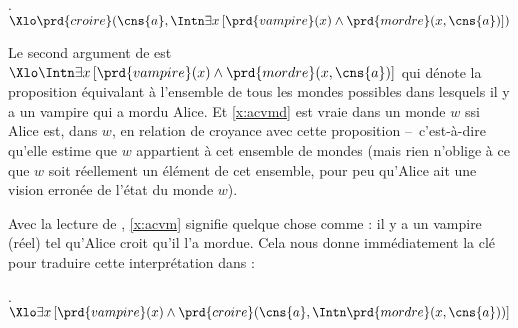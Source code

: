 \ex. 
\(\Xlo\prd{croire}(\cns{a}, \Intn\exists x\,[\prd{vampire}(x) \wedge \prd{mordre}(x,\cns{a})] )\)
\label{x:acvmd}


Le second argument de  est \(\Xlo\Intn\exists x\,[\prd{vampire}(x) \wedge \prd{mordre}(x,\cns{a})]\) qui dénote la proposition équivalant à l'ensemble de tous les mondes possibles dans lesquels il y a un vampire qui a mordu Alice.  Et \ref{x:acvmd} est vraie dans un monde $w$ ssi Alice est, dans $w$, en relation de croyance avec cette proposition --~c'est-à-dire qu'elle estime que $w$ appartient à cet ensemble de mondes (mais rien n'oblige à ce que $w$ soit réellement un élément de cet ensemble, pour peu qu'Alice ait une vision erronée de l'état du monde $w$).

Avec la lecture  de ,  \ref{x:acvm} signifie quelque chose comme : il y a un vampire (réel) tel qu'Alice croit qu'il l'a mordue. 
Cela nous donne immédiatement la clé pour traduire cette interprétation dans {\LO} :

\ex. 
\(\Xlo\exists x\,[\prd{vampire}(x) \wedge \prd{croire}(\cns{a}, \Intn\prd{mordre}(x,\cns{a}))]\)
\label{x:acvmr}



